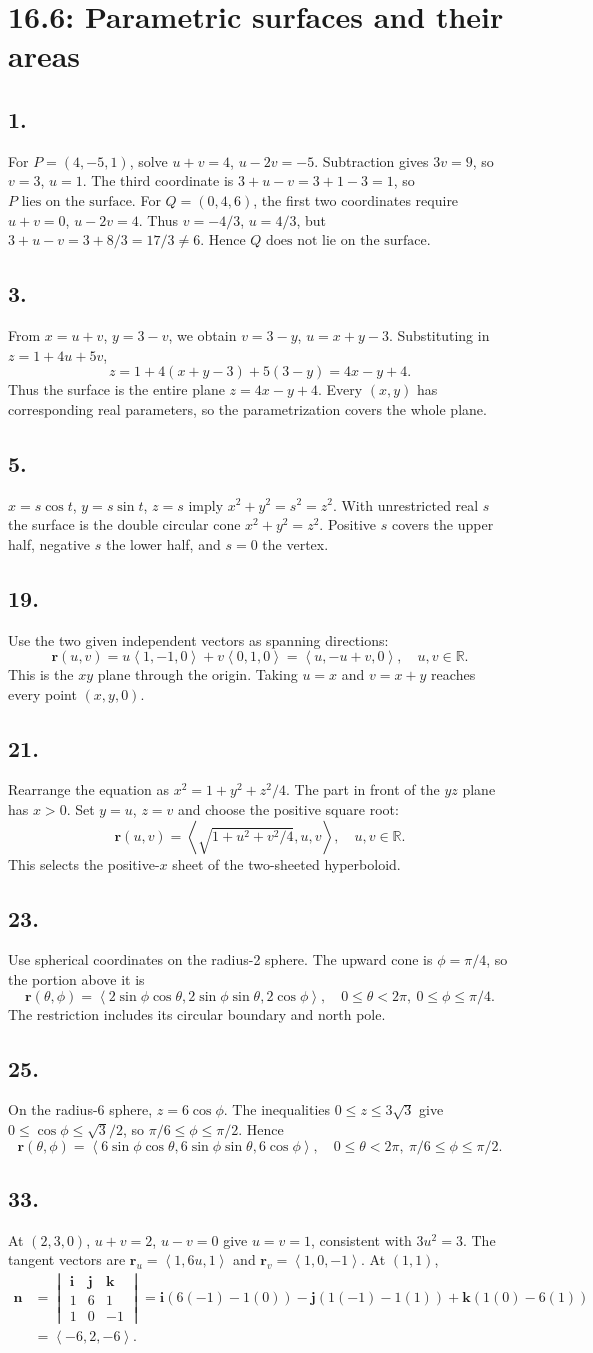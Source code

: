 \documentclass[11pt]{article}
\newcommand{\ex}[1]{\subsection*{#1.}}
\newcommand{\ans}[1]{\boxed{#1}}
\newcommand{\vv}[1]{\left\langle #1\right\rangle}
\newcommand{\ii}{\mathbf i}\newcommand{\jj}{\mathbf j}\newcommand{\kk}{\mathbf k}
\newcommand{\cp}[6]{\begin{vmatrix}\ii&\jj&\kk\\#1&#2&#3\\#4&#5&#6\end{vmatrix}}
\begin{document}
\clearpage\section*{16.6: Parametric surfaces and their areas}
\ex{1}
For $P=(4,-5,1)$, solve $u+v=4$, $u-2v=-5$. Subtraction gives $3v=9$, so $v=3$, $u=1$. The third coordinate is $3+u-v=3+1-3=1$, so $\ans{P\text{ lies on the surface}}$.
For $Q=(0,4,6)$, the first two coordinates require $u+v=0$, $u-2v=4$. Thus $v=-4/3$, $u=4/3$, but $3+u-v=3+8/3=17/3\ne6$. Hence $\ans{Q\text{ does not lie on the surface}}$.
\ex{3}
From $x=u+v$, $y=3-v$, we obtain $v=3-y$, $u=x+y-3$. Substituting in $z=1+4u+5v$,
\[z=1+4(x+y-3)+5(3-y)=4x-y+4.\]
Thus the surface is the entire plane $\ans{z=4x-y+4}$. Every $(x,y)$ has corresponding real parameters, so the parametrization covers the whole plane.
\ex{5}
$x=s\cos t$, $y=s\sin t$, $z=s$ imply $x^2+y^2=s^2=z^2$. With unrestricted real $s$ the surface is the double circular cone $\ans{x^2+y^2=z^2}$. Positive $s$ covers the upper half, negative $s$ the lower half, and $s=0$ the vertex.
\ex{19}
Use the two given independent vectors as spanning directions:
\[\ans{\mathbf r(u,v)=u\vv{1,-1,0}+v\vv{0,1,0}=\vv{u,-u+v,0}},\quad u,v\in\mathbb R.\]
This is the $xy$ plane through the origin. Taking $u=x$ and $v=x+y$ reaches every point $(x,y,0)$.
\ex{21}
Rearrange the equation as $x^2=1+y^2+z^2/4$. The part in front of the $yz$ plane has $x>0$. Set $y=u$, $z=v$ and choose the positive square root:
\[\ans{\mathbf r(u,v)=\vv{\sqrt{1+u^2+v^2/4},u,v}},\quad u,v\in\mathbb R.\]
This selects the positive-$x$ sheet of the two-sheeted hyperboloid.
\ex{23}
Use spherical coordinates on the radius-2 sphere. The upward cone is $\phi=\pi/4$, so the portion above it is
\[\ans{\mathbf r(\theta,\phi)=\vv{2\sin\phi\cos\theta,2\sin\phi\sin\theta,2\cos\phi}},\quad0\le\theta<2\pi,\ 0\le\phi\le\pi/4.\]
The restriction includes its circular boundary and north pole.
\ex{25}
On the radius-6 sphere, $z=6\cos\phi$. The inequalities $0\le z\le3\sqrt3$ give $0\le\cos\phi\le\sqrt3/2$, so $\pi/6\le\phi\le\pi/2$. Hence
\[\ans{\mathbf r(\theta,\phi)=\vv{6\sin\phi\cos\theta,6\sin\phi\sin\theta,6\cos\phi}},\quad0\le\theta<2\pi,\ \pi/6\le\phi\le\pi/2.\]
\ex{33}
At $(2,3,0)$, $u+v=2$, $u-v=0$ give $u=v=1$, consistent with $3u^2=3$. The tangent vectors are $\mathbf r_u=\vv{1,6u,1}$ and $\mathbf r_v=\vv{1,0,-1}$. At $(1,1)$,
\begin{align*}
\mathbf n&=\cp{1}{6}{1}{1}{0}{-1}
=\ii(6(-1)-1(0))-\jj(1(-1)-1(1))+\kk(1(0)-6(1))\\
&=\vv{-6,2,-6}.
\end{align*}
\end{document}
